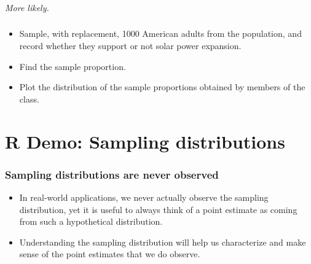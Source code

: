 \documentclass[t,compress,mathserif]{beamer}
\newcommand{\soln}[1]{\textit{#1}}
\begin{document}

\begin{frame}
    \frametitle{}
    
    
    \pause
    
    \soln{More likely.}
    
\end{frame}


\begin{frame}
    \frametitle{}
    
    
    \begin{itemize}
    
    \item Sample, with replacement, 1000 American adults from the population, and record whether they support or not solar power expansion.
    
    \item Find the sample proportion.
    
    \item Plot the distribution of the sample proportions obtained by members of the class.
    
    \end{itemize}
    
\end{frame}
    

\section{R Demo: Sampling distributions}


\begin{frame}
    \frametitle{Sampling distributions are never observed}

    \begin{itemize}

        \item In real-world applications, we never actually observe the sampling distribution, yet it is useful to always think of a point estimate as coming from such a hypothetical distribution.
        \item Understanding the sampling distribution will help us characterize and make sense of the point estimates that we do observe.

    \end{itemize}

\end{frame}
\end{document}
